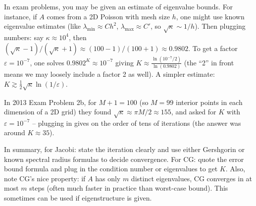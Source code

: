 \documentclass[a4paper,11pt]{report}
\begin{document}
In exam problems, you may be given an estimate of eigenvalue bounds. For instance, if $A$ comes from a 2D Poisson with mesh size $h$, one might use known eigenvalue estimates (like $\lambda_{\min}\approx C h^2$, $\lambda_{\max}\approx C'$, so $\sqrt{\kappa}\sim 1/h$). Then plugging numbers: say $\kappa \approx 10^4$, then $(\sqrt{\kappa}-1)/(\sqrt{\kappa}+1)\approx (100-1)/(100+1)\approx 0.9802$. To get a factor $\varepsilon=10^{-7}$, one solves $0.9802^K \approx 10^{-7}$ giving $K \approx \frac{\ln(10^{-7}/2)}{\ln(0.9802)}$ (the ``2'' in front means we may loosely include a factor 2 as well). A simpler estimate: $K \gtrsim \frac{1}{2}\sqrt{\kappa}\ln(1/\varepsilon)$.

In 2013 Exam Problem 2b, for $M+1=100$ (so $M=99$ interior points in each dimension of a 2D grid) they found $\sqrt{\kappa}\approx \pi M/2 \approx 155$, and asked for $K$ with $\varepsilon=10^{-7}$ -- plugging in gives on the order of tens of iterations (the answer was around $K\approx 35$).

In summary, for Jacobi: state the iteration clearly and use either Gershgorin or known spectral radius formulas to decide convergence. For CG: quote the error bound formula and plug in the condition number or eigenvalues to get $K$. Also, note CG's nice property: if $A$ has only $m$ distinct eigenvalues, CG converges in at most $m$ steps (often much faster in practice than worst-case bound). This sometimes can be used if eigenstructure is given.
\end{document}
